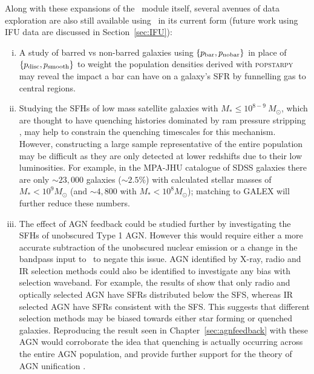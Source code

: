 Along with these expansions of the \starpy\ module itself, several avenues of data exploration are also still available using \starpy\ in its current form (future work using IFU data are discussed in Section~\ref{sec:IFU}):
\begin{enumerate}[(i)]

\item A study of barred vs non-barred galaxies using $\{p_{\rm{bar}}, p_{\rm{no bar}}\}$ in place of $\{p_{\rm{disc}}, p_{\rm{smooth}}\}$ to weight the population densities derived with \textsc{popstarpy} may reveal the impact a bar can have on a galaxy's SFR by funnelling gas to central regions.

\item Studying the SFHs of low mass satellite galaxies with $M_* \leq 10^{8-9} ~M_{\odot}$, which are thought to have quenching histories dominated by ram pressure stripping \citep{hester06, fillingham16}, may help to constrain the quenching timescales for this mechanism. However, constructing a large sample representative of the entire population may be difficult as they are only detected at lower redshifts due to their low luminosities. For example, in the MPA-JHU catalogue of SDSS galaxies there are only $\sim23,000$ galaxies ($\sim2.5\%$) with calculated stellar masses of $M_* < 10^9 M_{\odot}$ (and $\sim4,800$ with $M_* < 10^8 M_{\odot}$); matching to GALEX will further reduce these numbers. 

\item The effect of AGN feedback could be studied further by investigating the SFHs of unobscured Type 1 AGN. However this would require either a more accurate subtraction of the unobscured nuclear emission or a change in the bandpass input to \starpy\ to negate this issue. AGN identified by X-ray, radio and IR selection methods could also be identified to investigate any bias with selection waveband. For example, the results of \cite{ellison16} show that only radio and optically selected AGN have SFRs distributed below the SFS, whereas IR selected AGN have SFRs consistent with the SFS. This suggests that different selection methods may be biased towards either star forming or quenched galaxies. Reproducing the result seen in Chapter~\ref{sec:agnfeedback} with these AGN would corroborate the idea that quenching is actually occurring across the entire AGN population, and provide further support for the theory of AGN unification \citep{antonucci93, urry95}.

\end{enumerate}

